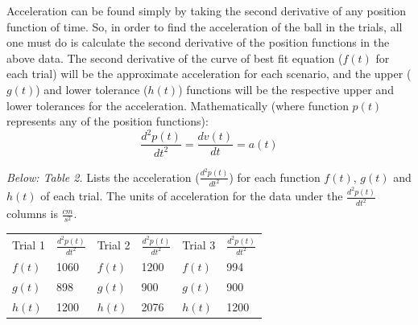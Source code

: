 \documentclass[12pt,letterpaper]{article}
\begin{document}
Acceleration can be found simply by taking the second derivative of any position function of time. So, in order to find the acceleration of the ball in the trials, all one must do is calculate the second derivative of the position functions in the above data. The second derivative of the curve of best fit equation (\(f(t)\) for each trial) will be the approximate acceleration for each scenario, and the upper (\(g(t)\)) and lower tolerance (\(h(t)\)) functions will be the respective upper and lower tolerances for the acceleration. Mathematically (where function \(p(t)\) represents any of the position functions):
\begin{equation}
\frac{d^2p(t)}{dt^2} = \frac{dv(t)}{dt} = a(t) 
\end{equation}

\textit{Below: Table 2.} Lists the acceleration (\(\frac{d^2p(t)}{dt^2}\)) for each function \(f(t)\), \(g(t)\) and \(h(t)\) of each trial. The units of acceleration for the data under the \(\frac{d^2p(t)}{dt^2}\) columns is \(\frac{cm}{s^2}\).
{\renewcommand{\arraystretch}{1.2}
\begin{table}[h]
\hspace*{1.1in}
\begin{tabular}{ll|ll|ll}
Trial 1 \hspace{12pt} & \(\frac{d^2p(t)}{dt^2}\)\hspace{12pt} & \hspace{12pt}Trial 2 \hspace{12pt}& \(\frac{d^2p(t)}{dt^2}\)\hspace{12pt} & \hspace{12pt}Trial 3 \hspace{12pt}&\(\frac{d^2p(t)}{dt^2}\)\\
\(f(t)\)       & 1060     & \hspace{12pt}\(f(t)\)   & 1200   & \hspace{12pt}\(f(t)\)   &  994\\
\(g(t)\)       & 898      & \hspace{12pt}\(g(t)\)   & 900    & \hspace{12pt}\(g(t)\)   &  900\\
\(h(t)\)       & 1200     & \hspace{12pt}\(h(t)\)   & 2076   & \hspace{12pt}\(h(t)\)   &  1200\\                 
\end{tabular}
\end{table}
}
\newline
\end{document}
